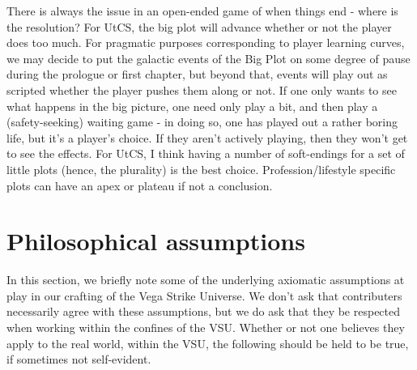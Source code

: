 There is always the issue in an open-ended game of when things end -
where is the resolution? For UtCS, the big plot will advance whether
or not the player does too much. For pragmatic purposes corresponding
to player learning curves, we may decide to put the galactic events of
the Big Plot on some degree of pause during the prologue or first
chapter, but beyond that, events will play out as scripted whether the
player pushes them along or not. If one only wants to see what happens
in the big picture, one need only play a bit, and then play a
(safety-seeking) waiting game - in doing so, one has played out a
rather boring life, but it's a player's choice. If they aren't
actively playing, then they won't get to see the effects.  For UtCS, I
think having a number of soft-endings for a set of little plots
(hence, the plurality) is the best choice. Profession/lifestyle
specific plots can have an apex or plateau if not a conclusion.

\section{Philosophical assumptions}

In this section, we briefly note some of the underlying axiomatic
assumptions at play in our crafting of the Vega Strike Universe. We
don't ask that contributers necessarily agree with these assumptions,
but we do ask that they be respected when working within the confines
of the VSU. Whether or not one believes they apply to the real world,
within the VSU, the following should be held to be true, if sometimes
not self-evident.

